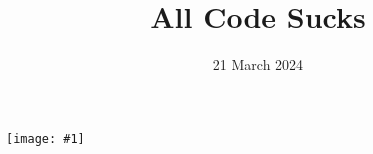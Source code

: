 \documentclass{beamer}
\newcommand{\bigpicture}[1]{%
  \begin{list}{}{%
    \vspace*{-0.6cm}%
    \setlength{\leftmargin}{-1.0cm}%
    \setlength{\listparindent}{\parindent}%
    \setlength{\itemindent}{\parindent}%
    \setlength{\parsep}{\parskip}%
  }%
  \item[]%
  \vspace*{\fill}
    \texttt{[image: \#1]}%
  \vspace*{\fill}
  \end{list}%
}%
\begin{document}
\title{All Code Sucks}
\date{21 March 2024} 

\begin{frame}
  \bigpicture{images/test_card.jpg}
  \note{
    \begin{itemize}
      \item 
    \end{itemize}
  }
\end{frame}
\end{document}
